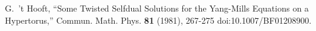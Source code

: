 G.~'t Hooft,
``Some Twisted Selfdual Solutions for the Yang-Mills Equations on a Hypertorus,''
Commun. Math. Phys. \textbf{81} (1981), 267-275
doi:10.1007/BF01208900.